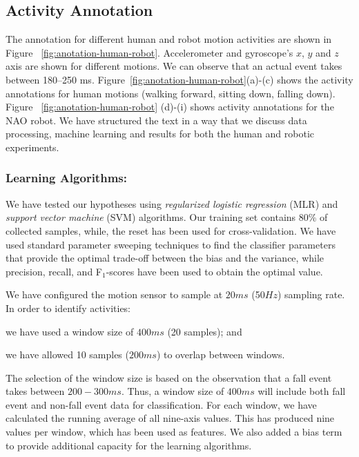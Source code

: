 \documentclass[letterpaper]{article}
\begin{document}
\begin{sloppy}
\subsection{Activity Annotation}

The annotation for different human and robot motion activities are shown in 
Figure {~\ref{fig:anotation-human-robot}}. 
Accelerometer and gyroscope's $x$, $y$ and $z$ axis are shown for different motions. We can observe 
that an 
actual event takes between 180--250 ms. Figure{~\ref{fig:anotation-human-robot}}(a)-(c) shows the activity 
annotations for human motions (walking forward, sitting down, falling down). 
Figure {~\ref{fig:anotation-human-robot}}
(d)-(i) shows activity annotations for the NAO robot. We have structured the text in a way that we discuss 
data processing, machine learning and results for both the human and robotic experiments.

\subsubsection{Learning Algorithms:}

We have tested our hypotheses using  {\em regularized logistic regression} (MLR) and {\em support 
vector machine} (SVM) algorithms. Our training set contains 80\% of collected samples, while, the 
reset has been used for cross-validation. We have used standard parameter sweeping techniques to 
find the classifier parameters that provide the optimal trade-off between the bias and the 
variance, while precision, recall, and F$_1$-scores have been used to obtain the optimal value. 

We  have configured the motion sensor to sample at  $20ms$ (50$Hz$) sampling rate. In order to 
identify activities: \begin{inparaenum}[1)] \item we have used a window size of $400ms$ (20 
samples); and \item we have allowed 10 samples ($200ms$) to overlap between windows. 
\end{inparaenum} The selection of the window size is based on the observation that a fall event 
takes between $200-300ms$. Thus, a window size of $400ms$ will include both fall event and 
non-fall event data for classification. For each window, we have calculated the running average of 
all nine-axis values. This has produced nine values per window, which has been used as features. We 
also added a bias term to provide additional capacity for the learning algorithms. 


\end{sloppy}
\end{document}
